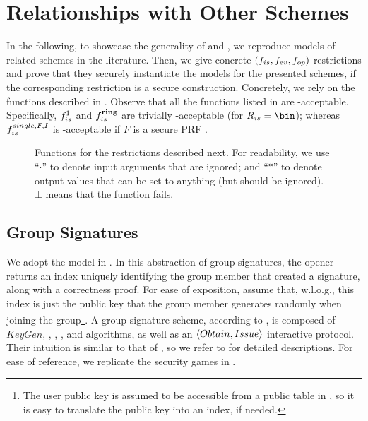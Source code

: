 \section{Relationships with Other Schemes}
\label{sec:relationships}


In the following, to showcase the generality of \UAS and \CUASGen, we reproduce
models of related schemes in the literature.
Then, we give concrete $(f_{is},f_{ev},f_{op})$-\CUASGen restrictions and prove
that they securely instantiate the models for the presented schemes, if the
corresponding \CUASGen restriction is a secure \UAS construction. Concretely,
we rely on the functions described in . Observe
that all the \fissue functions listed in  are
\UAS-acceptable. Specifically, $f_{is}^1$ and $f_{is}^{\mathbf{ring}}$ are trivially
\UAS-acceptable (for $\rngfissue = \bin$); whereas $f_{is}^{single,F,I}$ is
\UAS-acceptable if $F$ is a secure PRF \needcite.

\begin{figure}[ht!]
  
  \caption{Functions for the \CUASGen restrictions described next.
    For readability, we use ``$\cdot$'' to denote input arguments that are
    ignored; and ``$\ast$'' to denote output values that can be set to anything
    (but should be ignored). $\bot$ means that the function fails.}
  \label{fig:func-restrictions}
\end{figure}

\subsection{Group Signatures}
\label{ssec:related-models-gs}

We adopt the model in \cite{bsz05}. In this abstraction of group signatures, the
opener returns an index uniquely identifying the group member that created a
signature, along with a correctness proof. For ease of exposition, assume that,
w.l.o.g., this index is just the public key that the group member generates
randomly when joining the group\footnote{The user public key is assumed to be
  accessible from a public table in \cite{bsz05}, so it is easy to translate the
  public key into an index, if needed.}. A group signature scheme, according to
\cite{bsz05}, is composed of $KeyGen$, \UKeyGen, \Sign, \Verify, \Open and
\Judge algorithms, as well as an $\langle Obtain,Issue\rangle$ interactive
protocol. Their intuition is similar to that of \UAS, so we refer to
\cite{bsz05} for detailed descriptions. For ease of reference, we replicate the
security games in .

